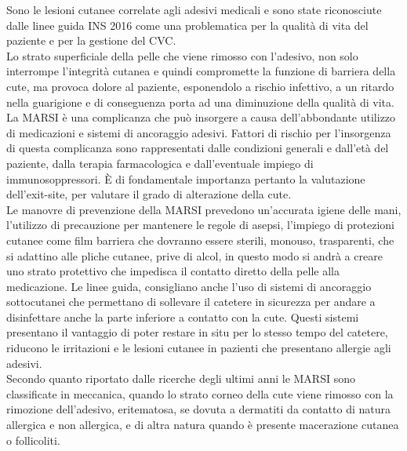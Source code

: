 Sono le lesioni cutanee correlate agli adesivi medicali e sono state riconosciute dalle linee guida INS 2016
come una problematica per la qualità di vita del paziente e per la gestione del CVC\cite{AIOMCVC}.\\
Lo strato superficiale della pelle che viene rimosso con l’adesivo, non solo interrompe l’integrità cutanea e quindi 
compromette la funzione di barriera della cute, ma provoca dolore al paziente, esponendolo a rischio infettivo, 
a un ritardo nella guarigione e di conseguenza porta ad una diminuzione della qualità di vita\cite{EMODIAL}.\\
La MARSI è una complicanza che può insorgere a causa dell’abbondante utilizzo di medicazioni e sistemi di ancoraggio 
adesivi. Fattori di rischio per l’insorgenza di questa complicanza sono rappresentati dalle condizioni generali e 
dall'età del paziente, dalla terapia farmacologica e dall’eventuale impiego di immunosoppressori. È di fondamentale 
importanza pertanto la valutazione dell’exit-site, per valutare il grado di alterazione della cute.\\ 
Le manovre di prevenzione della MARSI prevedono un’accurata igiene delle mani, l’utilizzo di precauzione per 
mantenere le regole di asepsi, l’impiego di protezioni cutanee come film barriera che dovranno essere sterili, 
monouso, trasparenti, che si adattino alle pliche cutanee, prive di alcol, in questo modo si andrà a creare uno 
strato protettivo che impedisca il contatto diretto della pelle alla medicazione. Le linee guida, consigliano anche 
l’uso di sistemi di ancoraggio sottocutanei che permettano di sollevare il catetere in sicurezza per andare a 
disinfettare anche la parte inferiore a contatto con la cute. Questi sistemi presentano il vantaggio di poter restare 
in situ per lo stesso tempo del catetere, riducono le irritazioni e le lesioni cutanee in pazienti che presentano 
allergie agli adesivi\cite{AIOMCVC}.\\
Secondo quanto riportato dalle ricerche degli ultimi anni le MARSI sono classificate in  meccanica, 
quando lo strato corneo della cute viene rimosso con la rimozione dell’adesivo, eritematosa, se dovuta a dermatiti da 
contatto di natura allergica e non allergica, e di altra natura quando è presente  macerazione cutanea o follicoliti\cite{EMODIAL}.\\

